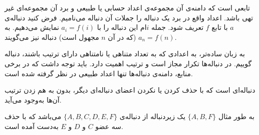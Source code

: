 \begin{DEFINITION}
	\p
{}
تابعی است که دامنه‌ی آن مجموعه‌ی اعداد حسابی یا طبیعی و برد آن مجموعه‌ای غیر تهی باشد.
اعداد واقع در برد یک دنباله را جملات آن دنباله می‌نامیم.
فرض کنید دنباله‌ی
$a$
با تابع
$f$
تعریف شود.
جمله
$i$ام
این دنباله را با
$a_i = f(i)$
نمایش می‌دهیم.
به 
$a_n = f(n)$
(که در آن $n$ مجهول است)
دنباله نیز می‌گویند.
\end{DEFINITION}

\p
به زبان ساده‌تر، به اعدادی که به تعداد متناهی یا نامتناهی دارای ترتیب باشند، دنباله
گوییم. در دنباله‌ها تکرار مجاز است و ترتیب اهمیت دارد.
باید توجه داشت که در برخی منابع، دامنه‌ی دنباله‌ها تنها اعداد طبیعی در نظر گرفته شده است.

\begin{DEFINITION}
\p
دنباله‌ای است که با حذف کردن یا نکردن اعضای دنباله‌ای دیگر، بدون به هم زدن ترتیب آن‌ها به‌وجود می‌آید.
\end{DEFINITION}
\p
به طور مثال
$\{A, B, F\}$
یک زیردنباله از دنباله‌ی
$\{A, B, C, D, E, F\}$
می‌باشد که با حذف سه عضو 
$C$
و
$D$
و
$E$
به‌دست آمده است.








